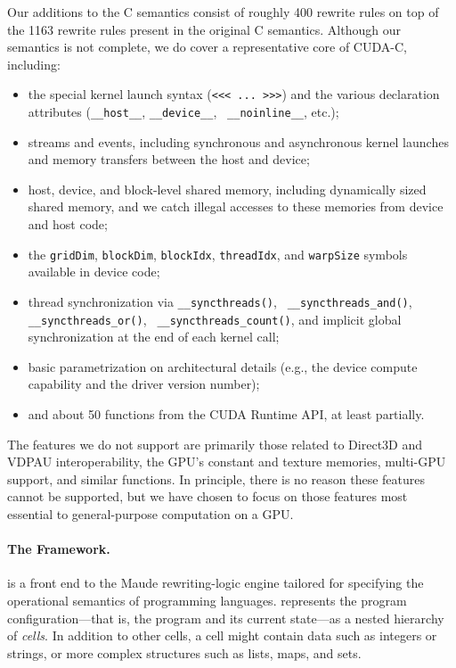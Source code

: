 Our additions to the C semantics consist of roughly 400 rewrite rules on top of
the 1163 rewrite rules present in the original C semantics. Although our
semantics is not complete, we do cover a representative core of CUDA-C,
including: 
\begin{itemize}
\item the special kernel launch syntax (\verb|<<< ... >>>|) and the various
declaration attributes ({\tt \_\_host\_\_}, {\tt \_\_device\_\_}, {\tt
\_\_noinline\_\_}, etc.);
\item streams and events, including synchronous and asynchronous kernel launches
and memory transfers between the host and device;
\item host, device, and block-level shared memory, including dynamically sized
shared memory, and we catch illegal accesses to these memories from device and
host code;
\item the {\tt gridDim}, {\tt blockDim}, {\tt blockIdx}, {\tt threadIdx}, and
{\tt warpSize} symbols available in device code;
\item thread synchronization via {\tt \_\_syncthreads()}, {\tt
\_\_syncthreads\_and()}, {\tt \_\_syncthreads\_or()}, {\tt
\_\_syncthreads\_count()}, and implicit global synchronization at the end of
each kernel call;
\item basic parametrization on architectural details (e.g., the device compute
capability and the driver version number); 
\item and about 50 functions from the CUDA Runtime API, at least partially. 
\end{itemize}

The features we do not support are primarily those related to Direct3D and VDPAU
interoperability, the GPU's constant and texture memories, multi-GPU support,
and similar functions. In principle, there is no reason these features
cannot be supported, but we have chosen to focus on those features most
essential to general-purpose computation on a GPU.

\paragraph{The \K Framework.}
\K is a front end to the Maude rewriting-logic engine tailored for specifying
the operational semantics of programming languages. \K represents the program
configuration---that is, the program and its current state---as a nested
hierarchy of {\em cells}. In addition to other cells, a cell might contain data
such as integers or strings, or more complex structures such as lists, maps, and
sets. 

